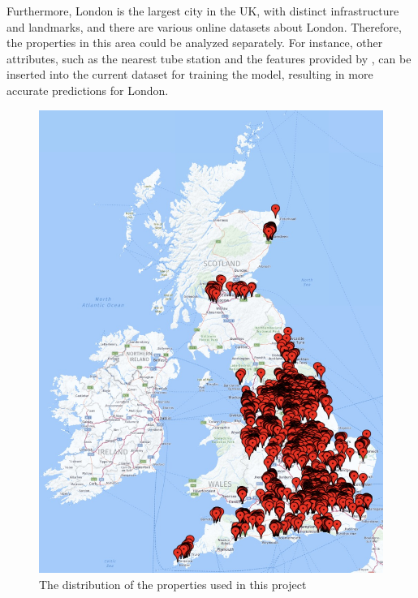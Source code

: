 \documentclass[12pt,twoside]{report}
\begin{document}
Furthermore, London is the largest city in the UK, with distinct infrastructure and landmarks, and there are various online datasets about London. Therefore, the properties in this area could be analyzed separately. For instance, other attributes, such as the nearest tube station and the features provided by \citet{RN26}, can be inserted into the current dataset for training the model, resulting in more accurate predictions for London. 

\begin{figure}[H]
	\centering
	\includegraphics[width=\linewidth]{uk_distribution}
	\caption{The distribution of the properties used in this project}
	\label{uk_distribution}
\end{figure}
\end{document}
